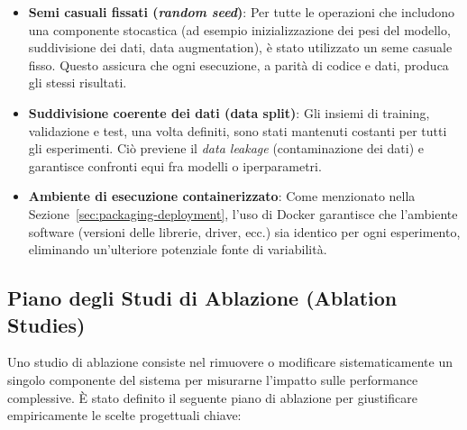 \documentclass[12pt,a4paper,openright,twoside]{book}
\begin{document}
\begin{itemize}
  \item \textbf{Semi casuali fissati (\emph{random seed})}:
  Per tutte le operazioni che includono una componente stocastica (ad esempio inizializzazione dei pesi del
  modello, suddivisione dei dati, data augmentation), è stato utilizzato un seme casuale fisso.
  Questo assicura che ogni esecuzione, a parità di codice e dati, produca gli stessi risultati.
  \item \textbf{Suddivisione coerente dei dati (data split)}:
  Gli insiemi di training, validazione e test, una volta definiti, sono stati mantenuti costanti per
  tutti gli esperimenti. Ciò previene il \emph{data leakage} (contaminazione dei dati) e garantisce confronti equi fra modelli o
  iperparametri.
  \item \textbf{Ambiente di esecuzione containerizzato}: Come menzionato nella Sezione~\ref{sec:packaging-deployment}, l'uso di Docker
  garantisce che l'ambiente software (versioni delle librerie, driver, ecc.) sia identico per ogni esperimento, eliminando un'ulteriore
  potenziale fonte di variabilità.
\end{itemize}

\subsection{Piano degli Studi di Ablazione (Ablation Studies)}
\label{sec:piano-ablazione}

Uno studio di ablazione consiste nel rimuovere o modificare sistematicamente un singolo componente del sistema
per misurarne l'impatto sulle performance complessive. È stato definito il seguente piano di ablazione per
giustificare empiricamente le scelte progettuali chiave:
\end{document}
